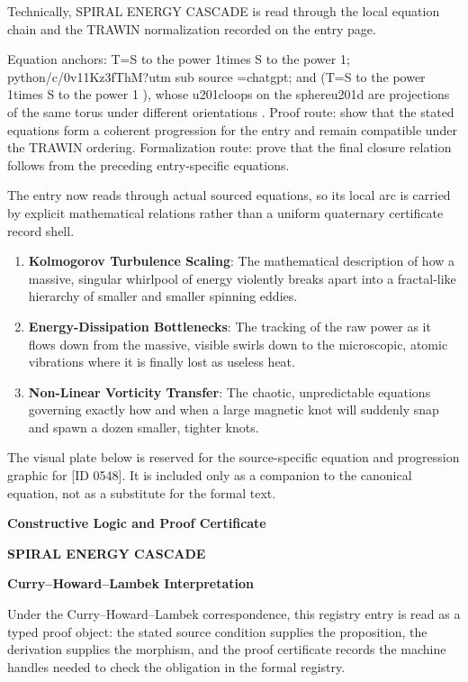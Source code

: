 Technically, SPIRAL ENERGY CASCADE is read through the local equation chain and the TRAWIN normalization recorded on the entry page.

Equation anchors: T=S to the power 1times S to the power 1; python/c/0v11Kz3fThM?utm sub source =chatgpt; and (T=S to the power 1times S to the power 1 ), whose u201cloops on the sphereu201d are projections of the same torus under different orientations . Proof route: show that the stated equations form a coherent progression for the entry and remain compatible under the TRAWIN ordering. Formalization route: prove that the final closure relation follows from the preceding entry-specific equations.

The entry now reads through actual sourced equations, so its local arc is carried by explicit mathematical relations rather than a uniform quaternary certificate record shell.
\endgroup

\begin{enumerate}[leftmargin=1.6em,itemsep=6pt,topsep=4pt]
\item \textbf{Kolmogorov Turbulence Scaling}: The mathematical description of how a massive, singular whirlpool of energy violently breaks apart into a fractal-like hierarchy of smaller and smaller spinning eddies.
\item \textbf{Energy-Dissipation Bottlenecks}: The tracking of the raw power as it flows down from the massive, visible swirls down to the microscopic, atomic vibrations where it is finally lost as useless heat.
\item \textbf{Non-Linear Vorticity Transfer}: The chaotic, unpredictable equations governing exactly how and when a large magnetic knot will suddenly snap and spawn a dozen smaller, tighter knots.
\end{enumerate}

\begingroup\footnotesize\sloppy
The visual plate below is reserved for the source-specific equation and progression graphic for [ID 0548]. It is included only as a companion to the canonical equation, not as a substitute for the formal text.
\par\endgroup
\ifTZPDarkEdition
{}
\fi

\clearpage
\begingroup\tzpsupportsetup
\noindent\textbf{\fontsize{10.8pt}{12.8pt}\selectfont [ID 0548] Constructive Logic and Proof Certificate}\par
\noindent\textbf{\fontsize{10pt}{12pt}\selectfont SPIRAL ENERGY CASCADE}\par
\vspace{0.45em}
\begingroup
\footnotesize
\setlength{\parskip}{0.22em}
\setlength{\parindent}{0pt}
\noindent\textbf{Curry--Howard--Lambek Interpretation}\par
Under the Curry--Howard--Lambek correspondence, this registry entry is read as a typed proof
object: the stated source condition supplies the proposition, the derivation supplies the
morphism, and the proof certificate records the machine handles needed to check the obligation
in the formal registry.

